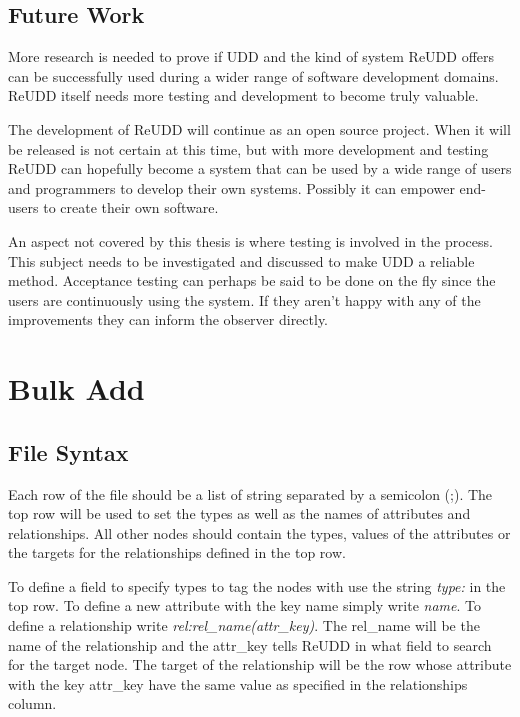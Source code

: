 \documentclass[a4paper]{report}
\begin{document}
\section{Future Work}
More research is needed to prove if UDD and the kind of system ReUDD offers can be successfully used during a wider range of software development domains. ReUDD itself needs more testing and development to become truly valuable.

The development of ReUDD will continue as an open source project. When it will be released is not certain at this time, but with more development and testing ReUDD can hopefully become a system that can be used by a wide range of users and programmers to develop their own systems. Possibly it can empower end-users to create their own software.

An aspect not covered by this thesis is where testing is involved in the process. This subject needs to be investigated and discussed to make UDD a reliable method. Acceptance testing can perhaps be said to be done on the fly since the users are continuously using the system. If they aren't happy with any of the improvements they can inform the observer directly.




\appendix

\chapter{Bulk Add} \label{app:csv-file}
\thispagestyle{empty}
\pagestyle{empty}

\section{File Syntax}
Each row of the file should be a list of string separated by a semicolon (;). The top row will be used to set the types as well as the names of attributes and relationships. All other nodes should contain the types, values of the attributes or the targets for the relationships defined in the top row.

To define a field to specify types to tag the nodes with use the string \emph{type:} in the top row. To define a new attribute with the key name simply write \emph{name}. To define a relationship write \emph{rel:rel\_name(attr\_key)}. The rel\_name will be the name of the relationship and the attr\_key tells ReUDD in what field to search for the target node. The target of the relationship will be the row whose attribute with the key attr\_key have the same value as specified in the relationships column.
\end{document}
